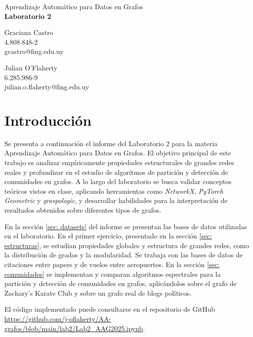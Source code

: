 \documentclass{article}
\begin{document}
\begin{center}
    {\Large Aprendizaje Automático para Datos en Grafos} \\
    {\LARGE \textbf{Laboratorio 2}} \\
    \vspace{2em}
    \begin{minipage}{0.45\textwidth}
        \centering
        Graciana Castro \\
        4.808.848-2 \\
        gcastro@fing.edu.uy
    \end{minipage}
    \hfill
    \begin{minipage}{0.45\textwidth}
        \centering
        Julian O'Flaherty \\
        6.285.986-9 \\
        julian.o.flaherty@fing.edu.uy
    \end{minipage}
\end{center}


\section{Introducción}


Se presenta a continuación el informe del Laboratorio 2 para la materia Aprendizaje Automático para Datos en Grafos. El objetivo principal de este trabajo es analizar empíricamente propiedades estructurales de grandes redes reales y profundizar en el estudio de algoritmos de partición y detección de comunidades en grafos. A lo largo del laboratorio se busca validar conceptos teóricos vistos en clase, aplicando herramientas como \textit{NetworkX}, \textit{PyTorch Geometric} y \textit{graspologic}, y desarrollar habilidades para la interpretación de resultados obtenidos sobre diferentes tipos de grafos.

En la sección \ref{sec: datasets} del informe se presentan las bases de datos utilizadas en el laboratorio. En el primer ejercicio, presentado en la sección \ref{sec: estructuras}, se estudian propiedades globales y estructura de grandes redes, como la distribución de grados y la modularidad. Se trabaja con las bases de datos de citaciones entre papers y de vuelos entre aeropuertos. En la sección \ref{sec: comunidades} se implementan y comparan algoritmos espectrales para la partición y detección de comunidades en grafos, aplicándolos sobre el grafo de Zachary's Karate Club y sobre un grafo real de blogs políticos.

El código implementado puede consultarse en el repositorio de GitHub \url{https://github.com/j-oflaherty/AA-grafos/blob/main/lab2/Lab2_AAG2025.ipynb}.
\end{document}
